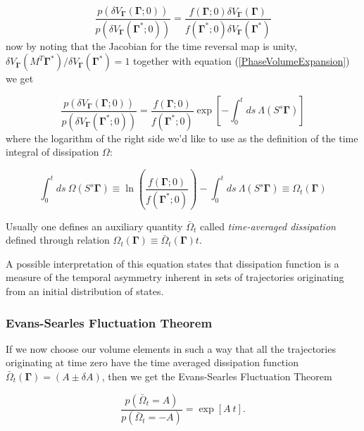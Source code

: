 \documentclass[a4paper,12pt,nofootinbib]{article}
\begin{document}
\begin{equation}
  \frac{p(\delta V_{\bm{\Gamma}}(\bm{\Gamma};0))}{p(\delta V_{\bm{\Gamma}}(\bm{\Gamma}^*;0))}= \frac{f(\bm{\Gamma};0)\delta V_{\bm{\Gamma}}(\bm{\Gamma})}{f(\bm{\Gamma}^*;0)\delta V_{\bm{\Gamma}}(\bm{\Gamma}^*)}
\end{equation}
now by noting that the Jacobian for the time reversal map is unity, 
\newline $ \delta V_{\bm{\Gamma}}(M^T \bm{\Gamma}^*)/ \delta V_{\bm{\Gamma}}(\bm{\Gamma}^*) =1 $ together with equation (\ref{PhaseVolumeExpansion}) we get


\begin{equation}
  \frac{p(\delta V_{\bm{\Gamma}}(\bm{\Gamma};0))}{p(\delta V_{\bm{\Gamma}}(\bm{\Gamma}^*;0))}=\frac{f(\bm{\Gamma};0)}{f(\bm{\Gamma}^*;0)} 
  \exp[-\int_0^t ds \ \Lambda(S^s \bm{\Gamma})]
\end{equation}
where the logarithm of the right side we'd like to use as the definition of the time integral of dissipation $\Omega$:

\begin{equation}
  \label{Dissipation}
  \int_0^t ds\ \Omega(S^s \bm{\Gamma})\equiv \ln(\frac{f(\bm{\Gamma};0)}{f(\bm{\Gamma}^*;0)}) -\int_0^t ds \ \Lambda(S^s \bm{\Gamma}) \equiv \Omega_t(\bm{\Gamma})
\end{equation}

Usually one defines an auxiliary quantity $\bar{\Omega}_t$ called \textit{time-averaged dissipation} defined through relation $\Omega_t(\bm{\Gamma}) \equiv \bar{\Omega}_t(\bm{\Gamma})t$.

A possible interpretation of this equation states that dissipation function is a measure of the temporal asymmetry inherent in sets of trajectories originating from an initial distribution of states.

\subsubsection{Evans-Searles Fluctuation Theorem}

If we now choose our volume elements in such a way that all the trajectories originating at time zero have the time averaged dissipation function $\bar{\Omega}_t(\bm{\Gamma})=(A \pm \delta A)$, then we get the Evans-Searles Fluctuation Theorem

\begin{equation}
\label{ESFT}
  \frac{p(\bar{\Omega}_t=A)}{p(\bar{\Omega}_t=-A)}=\exp[A\ t].
\end{equation}
\end{document}
